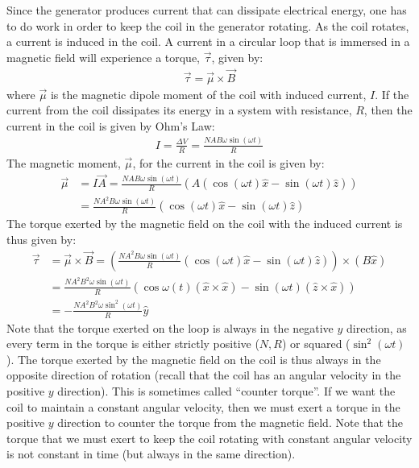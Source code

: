 Since the generator produces current that can dissipate electrical energy, one has to do work in order to keep the coil in the generator rotating. As the coil rotates, a current is induced in the coil. A current in a circular loop that is immersed in a magnetic field will experience a torque, $\vec \tau$, given by:
\begin{align*}
\vec \tau = \vec \mu \times \vec B
\end{align*}
where $\vec \mu$ is the magnetic dipole moment of the coil with induced current, $I$. If the current from the coil dissipates its energy in a system with resistance, $R$, then the current in the coil is given by Ohm's Law:
\begin{align*}
I = \frac{\Delta V}{R}=\frac{NAB\omega\sin(\omega t)}{R}
\end{align*}
The magnetic moment, $\vec \mu$, for the current in the coil is given by:
\begin{align*}
\vec \mu &= I\vec A = \frac{NAB\omega\sin(\omega t)}{R} (A(\cos(\omega t) \hat x -\sin(\omega t)\hat z))\\
&=\frac{NA^2B\omega\sin(\omega t)}{R} (\cos(\omega t) \hat x -\sin(\omega t)\hat z)
\end{align*}
The torque exerted by the magnetic field on the coil with the induced current is thus given by:
\begin{align*}
\vec \tau &= \vec \mu \times \vec B = \left(\frac{NA^2B\omega\sin(\omega t)}{R} (\cos(\omega t) \hat x -\sin(\omega t)\hat z)\right) \times (B\hat x)\\
&=\frac{NA^2B^2\omega\sin(\omega t)}{R}(\cos\omega(t)(\hat x \times \hat x)-\sin(\omega t)(\hat z \times \hat x))\\
&=-\frac{NA^2B^2\omega\sin^2(\omega t)}{R}\hat y
\end{align*}
Note that the torque exerted on the loop is always in the negative $y$ direction, as every term in the torque is either strictly positive ($N,R$) or squared ($\sin^2(\omega t)$). The torque exerted by the magnetic field on the coil is thus always in the opposite direction of rotation (recall that the coil has an angular velocity in the positive $y$ direction). This is sometimes called ``counter torque''. If we want the coil to maintain a constant angular velocity, then we must exert a torque in the positive $y$ direction to counter the torque from the magnetic field. Note that the torque that we must exert to keep the coil rotating with constant angular velocity is not constant in time (but always in the same direction). 

